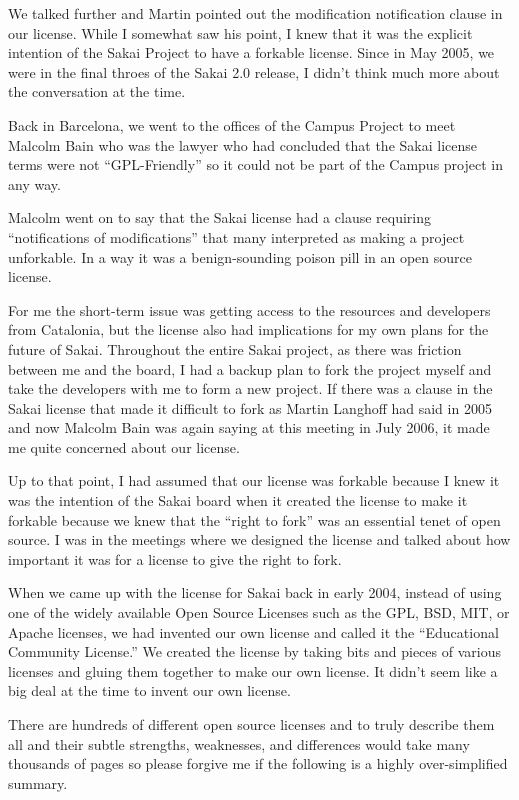 \documentclass[12pt]{book}
\begin{document}
We talked further and Martin pointed out the
modification notification clause in our license.
While I somewhat saw his point, I knew that it was
the explicit intention of the Sakai Project to
have a forkable license.  Since in May 2005, we
were in the final throes of the Sakai 2.0 release,
I didn't think much more about the conversation at the
time.

Back in Barcelona, we went to the offices of the
Campus Project to meet Malcolm Bain who was
the lawyer who had concluded that the Sakai license
terms were not ``GPL-Friendly'' so it could not
be part of the Campus project in any way.

Malcolm went on to say that the Sakai license
had a clause requiring
``notifications of modifications'' that many
interpreted as making a project unforkable.  In a
way it was a benign-sounding poison pill in an
open source license.

For me the short-term issue was getting access to
the resources and developers from Catalonia, but
the license also had implications for my own
plans for the future of Sakai.  Throughout
the entire Sakai project, as there was friction
between me and the board, I had a backup plan
to fork the project myself and take the developers
with me to form a new project.  If there was a
clause in the Sakai license that made it difficult
to fork as Martin Langhoff had said in 2005 and
now Malcolm Bain was again saying at this meeting
in July 2006, it made me quite concerned
about our license.

Up to that point, I had assumed that our license
was forkable because I knew it was the intention
of the Sakai board when it created the license
to make it forkable because we knew that the
``right to fork'' was an essential tenet of
open source.  I was in the meetings where we designed
the license and talked about how important it
was for a license to give the right to fork.

When we came up with the license for Sakai
back in early 2004, instead of using one of the
widely available Open Source Licenses such
as the GPL, BSD, MIT, or Apache
licenses, we had invented our own license and called
it the ``Educational Community License.''  We created the
license by taking bits and pieces
of various licenses and gluing them together to make
our own license.  It didn't seem like a big deal at
the time to invent our own license.

There are hundreds of different open source licenses
and to truly describe them all and their subtle
strengths, weaknesses, and differences would
take many thousands of pages so please forgive me
if the following is a highly over-simplified summary.
\end{document}
